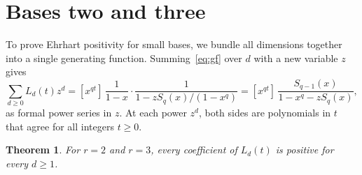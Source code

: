 \documentclass[11pt]{amsart}
\newtheorem{theorem}{Theorem}[section]
\theoremstyle{remark}
\begin{document}
\section{Bases two and three}\label{sec:23}

To prove Ehrhart positivity for small bases, we bundle all dimensions together
into a single generating function. Summing~\eqref{eq:gf} over $d$ with a new
variable $z$ gives
\begin{equation}\label{eq:sumd}
 \sum_{d\ge0}L_d(t)z^d=[x^{qt}]\,\frac{1}{1-x}\cdot\frac{1}{1-zS_q(x)/(1-x^q)}
 =[x^{qt}]\,\frac{S_{q-1}(x)}{1-x^q-zS_q(x)},
\end{equation}
as formal power series in $z$. At each power $z^d$, both sides are polynomials
in $t$ that agree for all integers $t\ge0$.

\begin{theorem}\label{thm:23}
For $r=2$ and $r=3$, every coefficient of $L_d(t)$ is positive for every $d\ge1$.
\end{theorem}
\end{document}
